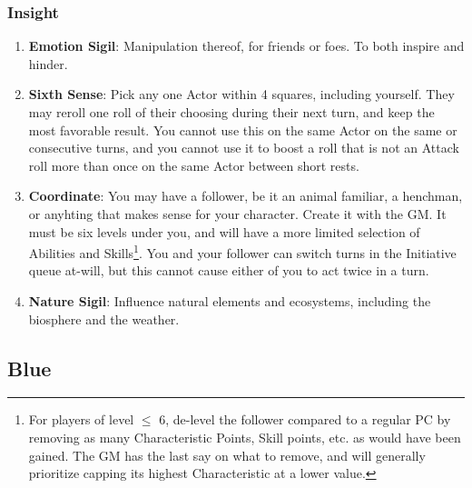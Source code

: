 \subsubsection{Insight}
\begin{enumerate}
    \item \textbf{Emotion Sigil}: Manipulation thereof, for friends or foes. To both inspire and hinder.
    \item \textbf{Sixth Sense}: Pick any one Actor within 4 squares, including yourself. They may reroll one roll of their choosing during their next turn, and keep the most favorable result. You cannot use this on the same Actor on the same or consecutive turns, and you cannot use it to boost a roll that is not an Attack roll more than once on the same Actor between short rests.
    \item \textbf{Coordinate}: You may have a follower, be it an animal familiar, a henchman, or anyhting that makes sense for your character. Create it with the GM. It must be six levels under you, and will have a more limited selection of Abilities and Skills\footnote{For players of level $\leq$ 6, de-level the follower compared to a regular PC by removing as many Characteristic Points, Skill points, etc. as would have been gained. The GM has the last say on what to remove, and will generally prioritize capping its highest Characteristic at a lower value.}. You and your follower can switch turns in the Initiative queue at-will, but this cannot cause either of you to act twice in a turn.
    \item \textbf{Nature Sigil}: Influence natural elements and ecosystems, including the biosphere and the weather.
\end{enumerate}


\subsection{Blue}


